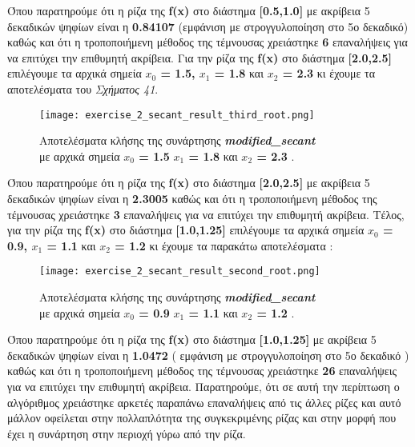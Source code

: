 \documentclass[First Project.tex]{subfiles}
\begin{document}
Όπου παρατηρούμε ότι η ρίζα της \textlatin{\textbf{f(x)}} στο διάστημα \textlatin{\textbf{[0.5,1.0]}} με ακρίβεια 5 δεκαδικών ψηφίων 
είναι η \textbf{0.84107} (εμφάνιση με στρογγυλοποίηση στο 5ο δεκαδικό) καθώς και ότι η τροποποιήμενη μέθοδος της τέμνουσας χρειάστηκε \textbf{6} επαναλήψεις για να επιτύχει την 
επιθυμητή ακρίβεια. Για την ρίζα της \textlatin{\textbf{f(x)}} στο διάστημα \textlatin{\textbf{[2.0,2.5]}} επιλέγουμε τα αρχικά σημεία 
\textbf{$x_{0}$ = 1.5, $x_{1}$ = 1.8} και \textbf{$x_{2}$ = 2.3} κι έχουμε τα αποτελέσματα του \textit{Σχήματος 41}.
\vspace{5px}
\begin{figure}[h!]
    \centering
    \captionsetup{justification=centering}
    \begin{center}
    \texttt{[image: exercise\_2\_secant\_result\_third\_root.png]}    
    \caption{ Αποτελέσματα κλήσης της συνάρτησης \textit{\textlatin{\textbf{modified\_secant}}} \\ με αρχικά σημεία \textbf{\textlatin{$x_{0}$ = 1.5}} 
                \textbf{\textlatin{$x_{1}$ = 1.8}} και \textbf{\textlatin{$x_{2}$ = 2.3}} . }
    \end{center}
\end{figure}

Όπου παρατηρούμε ότι η ρίζα της \textlatin{\textbf{f(x)}} στο διάστημα \textlatin{\textbf{[2.0,2.5]}} με ακρίβεια 5 δεκαδικών ψηφίων 
είναι η \textbf{2.3005} καθώς και ότι η τροποποιήμενη μέθοδος της τέμνουσας χρειάστηκε \textbf{3} επαναλήψεις για να επιτύχει την 
επιθυμητή ακρίβεια. Τέλος, για την ρίζα της \textlatin{\textbf{f(x)}} στο διάστημα \textlatin{\textbf{[1.0,1.25]}} επιλέγουμε τα αρχικά σημεία 
\textbf{$x_{0}$ = 0.9, $x_{1}$ = 1.1} και \textbf{$x_{2}$ = 1.2} κι έχουμε τα παρακάτω αποτελέσματα :
\vspace{5px}
\begin{figure}[h!]
    \centering
    \captionsetup{justification=centering}
    \begin{center}
    \texttt{[image: exercise\_2\_secant\_result\_second\_root.png]}    
    \caption{ Αποτελέσματα κλήσης της συνάρτησης \textit{\textlatin{\textbf{modified\_secant}}} \\ με αρχικά σημεία \textbf{\textlatin{$x_{0}$ = 0.9}} 
                \textbf{\textlatin{$x_{1}$ = 1.1}} και \textbf{\textlatin{$x_{2}$ = 1.2}} . }
    \end{center}
\end{figure}

Όπου παρατηρούμε ότι η ρίζα της \textlatin{\textbf{f(x)}} στο διάστημα \textlatin{\textbf{[1.0,1.25]}} με ακρίβεια 5 δεκαδικών ψηφίων 
είναι η \textbf{1.0472} ( εμφάνιση με στρογγυλοποίηση στο 5ο δεκαδικό ) καθώς και ότι η τροποποιήμενη  μέθοδος της τέμνουσας χρειάστηκε \textbf{26} επαναλήψεις για να επιτύχει την 
επιθυμητή ακρίβεια. Παρατηρούμε, ότι σε αυτή την περίπτωση ο αλγόριθμος χρειάστηκε αρκετές παραπάνω επαναλήψεις από τις άλλες ρίζες και αυτό
μάλλον οφείλεται στην πολλαπλότητα της συγκεκριμένης ρίζας και στην μορφή που έχει η συνάρτηση στην περιοχή γύρω από την ρίζα. 
\end{document}
